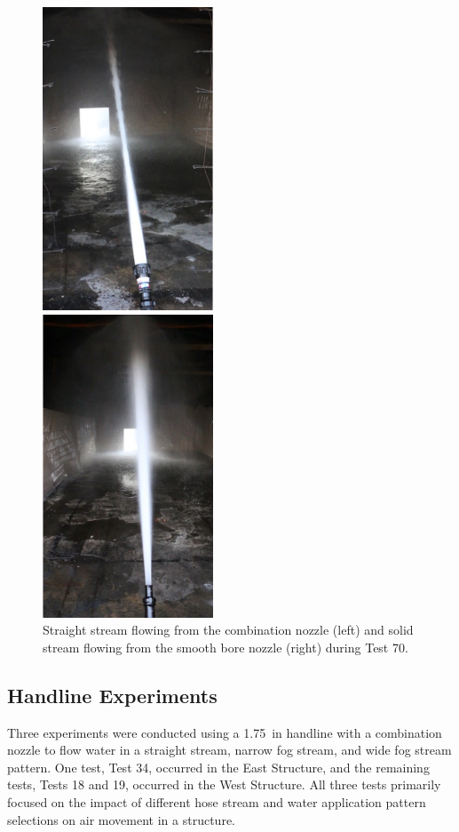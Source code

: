 \documentclass[12pt,oneside]{book}
\begin{document}
\begin{figure}[!ht]
	\minipage{2.15in}
	\begin{center}
		\includegraphics[width=2in]{../Figures/Pictures/SS_70}
	\end{center} 
	\endminipage
	\minipage{2.15in}
	\begin{center}
		\includegraphics[width=2in]{../Figures/Pictures/SB_70}
	\end{center}
	\endminipage
	\caption[Straight stream from combination nozzle and solid stream from smooth bore nozzle during Test 70.]{Straight stream flowing from the combination nozzle (left) and solid stream flowing from the smooth bore nozzle (right) during Test 70.}
	\label{fig:test_70_pic}
\end{figure}
\FloatBarrier

\subsection{Handline Experiments}
\label{sec:handline_procedure}
Three experiments were conducted using a 1.75~in handline with a combination nozzle to flow water in a straight stream, narrow fog stream, and wide fog stream pattern. One test, Test 34, occurred in the East Structure, and the remaining tests, Tests 18 and 19, occurred in the West Structure. All three tests primarily focused on the impact of different hose stream and water application pattern selections on air movement in a structure. 
\end{document}
